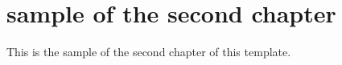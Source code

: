 \chapter{sample of the second chapter}\label{ch2:sample}
This is the sample of the second chapter of this template.

